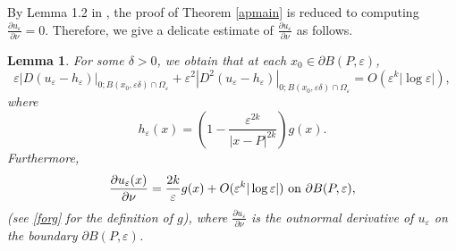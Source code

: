 \documentclass[11pt,reqno]{article}
\newtheorem{lemma}[teo]{Lemma}
\numberwithin{equation}{section}
\newcommand\e\varepsilon
\renewcommand\O\Omega
\begin{document}
By  Lemma 1.2 in \cite{CSLin1987}, the proof of Theorem \ref{apmain} is reduced to computing $\frac{\partial u_\e}{\partial\nu}=0$. Therefore, we give a delicate estimate of $\frac{\partial u_\e}{\partial\nu}$ as follows. 
  \begin{lemma}\label{lem2901-1}
  For some $\delta>0$, we obtain that at each $x_0\in \partial B(P,\e)$,
    \begin{equation}\label{eq0304-2}
       \e|D(u_\e-h_\e)|_{0;B(x_0,\e\delta)\cap \O_\e }+\e^2|D^2(u_\e-h_\e)|_{0;B(x_0,\e\delta)\cap \O_\e }=O(\e^{k}|\log\e|),
    \end{equation}  
    where 
    \begin{equation}
      h_\e(x)=  \left(1-\frac{\e^{2k}}{|x-P|^{2k}}\right)g(x).
    \end{equation}
    Furthermore,
         \begin{equation}\label{eq0304-3}
        \frac{\partial u_\e(x)}{\partial\nu}=\frac{2k}{\e}g(x)+O(\e^{k}|\log\e|)\ \hbox{on } \partial B(P,\e),
    \end{equation}
     (see \eqref{forg} for the definition of $g$),
    where 
    $\frac{\partial u_\e}{\partial\nu}$ is the outnormal derivative of $u_\e$ on the boundary $\partial B(P,\e)$.
    \end{lemma}
\end{document}
